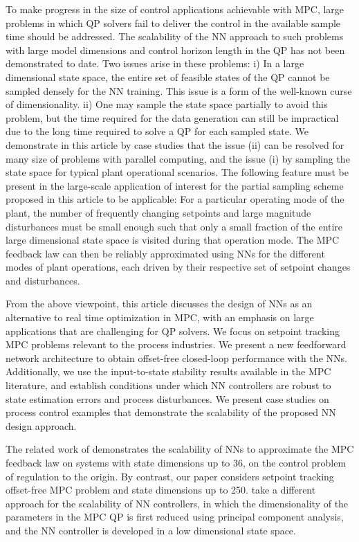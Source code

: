 \documentclass[preprint,5p, twocolumn, authoryear]{elsarticle}
\begin{document}
To make progress in the size of control applications achievable with MPC, large
problems in which QP solvers fail to deliver the control in the available sample
time should be addressed. The scalability of the NN approach to such problems
with large model dimensions and control horizon length in the QP has not been
demonstrated to date. Two issues arise in these problems: i) In a large
dimensional state space, the entire set of feasible states of the QP cannot be
sampled densely for the NN training. This issue is a form of the well-known
curse of dimensionality. ii) One may sample the state space partially to avoid
this problem, but the time required for the data generation can still be
impractical due to the long time required to solve a QP for each sampled state.
We demonstrate in this article by case studies that the issue (ii) can be
resolved for many size of problems with parallel computing, and the issue (i) by
sampling the state space for typical plant operational scenarios. The following
feature must be present in the large-scale application of interest for the
partial sampling scheme proposed in this article to be applicable: For a
particular operating mode of the plant, the number of frequently changing
setpoints and large magnitude disturbances must be small enough such that only a
small fraction of the entire large dimensional state space is visited during
that operation mode. The MPC feedback law can then be reliably approximated
using NNs for the different modes of plant operations, each driven by their
respective set of setpoint changes and disturbances.

From the above viewpoint, this article discusses the design of NNs as an
alternative to real time optimization in MPC, with an emphasis on large
applications that are challenging for QP solvers. We focus on setpoint tracking
MPC problems relevant to the process industries. We present a new feedforward
network architecture to obtain offset-free closed-loop performance with the NNs.
Additionally, we use the input-to-state stability results available in the MPC
literature, and establish conditions under which NN controllers are robust to
state estimation errors and process disturbances. We present case studies on
process control examples that demonstrate the scalability of the proposed NN
design approach.

The related work of \cite{chen:wang:atanasov:kumar:morari:2019} demonstrates the
scalability of NNs to approximate the MPC feedback law on systems with state
dimensions up to 36, on the control problem of regulation to the origin. By
contrast, our paper considers setpoint tracking offset-free MPC problem and
state dimensions up to 250. \cite{drgona:picard:kvasnica:helsen:2018} take a
different approach for the scalability of NN controllers, in which the
dimensionality of the parameters in the MPC QP is first reduced using principal
component analysis, and the NN controller is developed in a low dimensional
state space.
\end{document}
